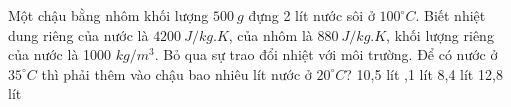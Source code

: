 	\begin{vidu} 
	Một chậu bằng nhôm khối lượng $500 \ g$ đựng 2 lít nước sôi ở $100^\circ C$.  Biết nhiệt dung riêng của nước là $4200 \ J/kg. K$, của nhôm là $880 \ J/kg. K$, khối lượng riêng của nước là 1000 $kg/m^3$. Bỏ qua sự trao đổi nhiệt với môi trường.  Để có nước ở $35^\circ C$ thì phải thêm vào chậu bao nhiêu lít nước ở $20^\circ C$? 
	\choice
	{10,5 lít}
	{,1 lít}
	{8,4 lít}
	{12,8 lít}
\end{vidu}

